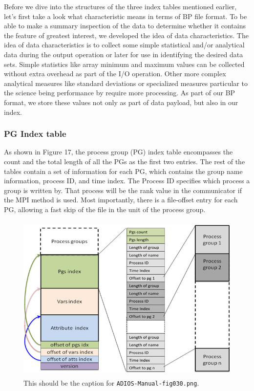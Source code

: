 Before we dive into the structures of the three index tables mentioned earlier, 
let's first take a look what characteristic means in terms of BP file format. To 
be able to make a summary inspection of the data to determine whether it contains 
the feature of greatest interest, we developed the idea of data characteristics. 
The idea of data characteristics is to collect some simple statistical and/or analytical 
data during the output operation or later for use in identifying the desired data 
sets. Simple statistics like array minimum and maximum values can be collected 
without extra overhead as part of the I/O operation. Other more complex analytical 
measures like standard deviations or specialized measures particular to the science 
being performance by require more processing. As part of our BP format, we store 
these values not only as part of data payload, but also in our index. 

\subsubsection{PG Index table}

As shown in Figure 17, the process group (PG) index table encompasses the count 
and the total length of all the PGs as the first two entries. The rest of the tables 
contain a set of information for each PG, which contains the group name information, 
process ID, and time index. The Process ID specifies which process a group is written 
by. That process will be the rank value in the communicator if the MPI method is 
used. Most importantly, there is a file-offset entry for each PG, allowing a fast 
skip of the file in the unit of the process group.

\begin{figure}[htbp]
\begin{center}
\includegraphics[width=338pt, height=238pt]{ADIOS-Manual-fig030.png}
\caption{This should be the caption for \texttt{ADIOS-Manual-fig030.png}.}
\end{center}
\end{figure}\label{HRef119578810}\label{HToc144350176}

